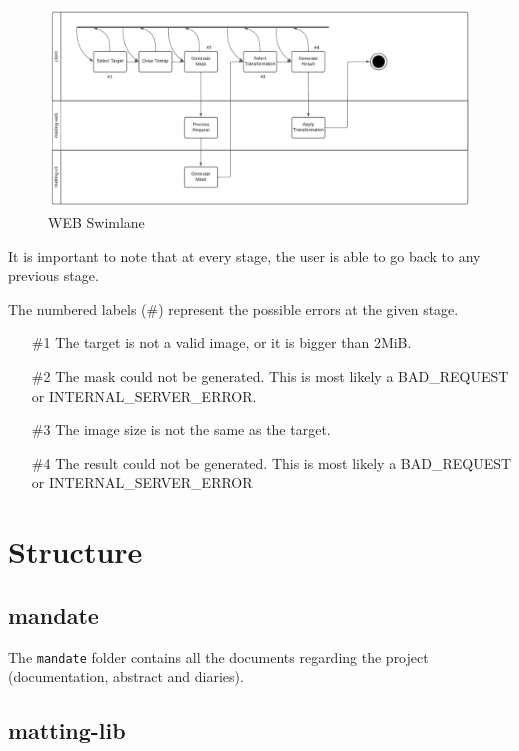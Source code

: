 \documentclass[a4paper]{article}
\begin{document}
\begin{figure}[h]
    \includegraphics[width=\textwidth]{media/swimlane/swimlane3.pdf}
    \caption{WEB Swimlane}
\end{figure}

It is important to note that at every stage, the user is able
to go back to any previous stage.

The numbered labels (\#) represent the possible errors at the given stage.

\begin{itemize}
    \item[\#1] The target is not a valid image, or it is bigger than 2MiB.
    \item[\#2] The mask could not be generated.
        This is most likely a \textsc{BAD\_REQUEST}
        or \textsc{INTERNAL\_SERVER\_ERROR}.
    \item[\#3] The image size is not the same as the target.
    \item[\#4] The result could not be generated.
        This is most likely a \textsc{BAD\_REQUEST}
        or \textsc{INTERNAL\_SERVER\_ERROR}
\end{itemize}

\pagebreak

\section{Structure}

\subsection{mandate}

The \texttt{mandate} folder contains all the documents regarding
the project (documentation, abstract and diaries).

\subsection{matting-lib}
\end{document}
